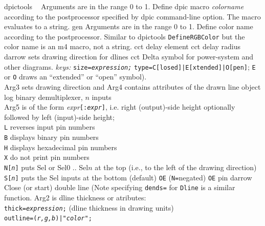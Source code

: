 %
  {dpictools}%
  {$\;\;$ Arguments are in the range 0 to 1. Define dpic macro {\sl colorname}
    according to the postprocessor specified by dpic command-line option.
    The macro evaluates to a string.}%
%
  {gen}%
  {Arguments are in the range 0 to 1. Define color name
    according to the postprocessor.  Similar to dpictools {\tt DefineRGBColor}
    but the color name is an m4 macro, not a string.}%
%
  {cct}%
  {delay element}%
%
  {cct}%
  {delay radius}%
%
  {darrow}%
  {sets drawing direction for dlines}%
%
  {cct}%
  {Delta symbol for power-system and other diagrams.
   {\sl keys:} {\tt size={\sl expression;}}
    {\tt type=C[losed]|E[xtended]|O[pen]};
      {\tt E} or {\tt O} draws an ``extended'' or ``open'' symbol).\\
     Arg3 sets drawing direction and
     Arg4 contains attributes of the drawn line object }%
%
  {log}%
  {binary demultiplexer, $n$ inputs\\
    Arg5 is of the form {\sl expr}{\tt [:{\sl expr}]}, i.e. right (output)-side
     height optionally followed by left (input)-side height;\\
    {\tt L} reverses input pin numbers\\
    {\tt B} displays binary pin numbers\\
    {\tt H} displays hexadecimal pin numbers\\
    {\tt X} do not print pin numbers\\
    {\tt N[{\sl n}]} puts Sel or Sel$0$ .. Sel$n$ at the top
    (i.e., to the left of the drawing direction)\\
    {\tt S[{\sl n}]} puts the Sel inputs at the bottom (default)
    {\tt OE} ({\tt N=}negated) {\tt OE} pin
    }%
%
  {darrow}%
  {Close (or start) double line (Note specifying {\tt dends=} for {\tt Dline}
   is a similar function.  Arg2 is dline thickness or atributes:\\
   {\tt thick={\sl expression};} (dline thickness in drawing units)\\
   {\tt outline=({\sl r,g,b})|"{\sl color}";}}%
